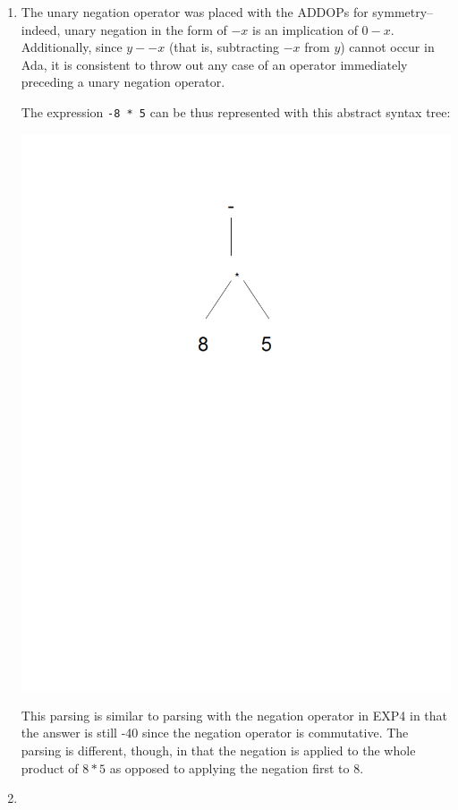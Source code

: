 \documentclass[landscape]{report}
\begin{document}
\begin{enumerate}
\begin{enumerate}
    \end{enumerate}
    \item %
      The unary negation operator was placed with the ADDOPs for symmetry--
      indeed, unary negation in the form of $-x$ is an implication of $0-x$.
      Additionally, since $y--x$ (that is, subtracting $-x$ from $y$) cannot
      occur in Ada, it is consistent to throw out any case of an operator
      immediately preceding a unary negation operator.
      
      The expression \lstinline{-8 * 5} can be thus represented with this
      abstract syntax tree:
      
      \includegraphics{img/prob5.png}
      
      This parsing is similar to parsing with the negation operator in EXP4 in
      that the answer is still -40 since the negation operator is commutative.
      The parsing is different, though, in that the negation is applied to the
      whole product of $8 * 5$ as opposed to applying the negation first to 8.
    \item %
      
  \end{enumerate}
\end{document}
